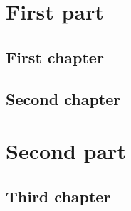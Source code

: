 \documentclass[a4paper,10pt,twoside,onecolumn]{book}
\begin{document}
\pagestyle{empty}


\cleardoublepage

\pagestyle{plain}

\tableofcontents
\cleardoublepage

\listoffigures
\cleardoublepage

\listoftables
\cleardoublepage

\pagestyle{headings}

\part{First part}

\chapter{First chapter}


\chapter{Second chapter}


\part{Second part}

\chapter{Third chapter}

\end{document}
